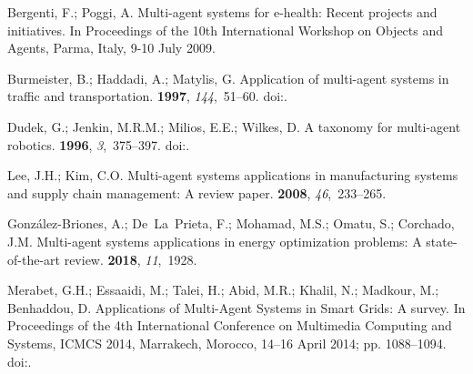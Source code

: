 \documentclass[jsan,article,accept,moreauthors,pdftex]{Definitions/mdpi}
\begin{document}
\begin{thebibliography}{999}
Bergenti, F.; Poggi, A.
\newblock Multi-agent systems for e-health: Recent projects and initiatives.
\newblock   In Proceedings of the 10th International Workshop on Objects and Agents,  Parma, Italy, 9-10 July 2009. %


Burmeister, B.; Haddadi, A.; Matylis, G.
\newblock Application of multi-agent systems in traffic and transportation.
 {\bf 1997}, {\em 144},~51--60.
\newblock
  doi:{\href{https://doi.org/10.1049/ip-sen:19971023}{}}.

Dudek, G.; Jenkin, M.R.M.; Milios, E.E.; Wilkes, D.
\newblock A taxonomy for multi-agent robotics.
 {\bf 1996}, {\em 3},~375--397.
\newblock
  doi:{\href{https://doi.org/10.1007/BF00240651}{}}.

Lee, J.H.; Kim, C.O.
\newblock Multi-agent systems applications in manufacturing systems and supply
  chain management: A review paper.
 {\bf 2008}, {\em 46},~233--265.

Gonz{\'a}lez-Briones, A.; De~La~Prieta, F.; Mohamad, M.S.; Omatu, S.; Corchado,
  J.M.
\newblock Multi-agent systems applications in energy optimization problems: A
  state-of-the-art review.
 {\bf 2018}, {\em 11},~1928.

Merabet, G.H.; Essaaidi, M.; Talei, H.; Abid, M.R.; Khalil, N.; Madkour, M.;
  Benhaddou, D.
\newblock Applications of Multi-Agent Systems in Smart Grids: {A} survey.
\newblock   In Proceedings of the 4th International Conference on Multimedia Computing and Systems,
  {ICMCS} 2014, Marrakech, Morocco, 14--16 April 2014; pp.
  1088--1094.
\newblock
  doi:{\href{https://doi.org/10.1109/ICMCS.2014.6911384}{}}.


\end{thebibliography}
\end{document}
